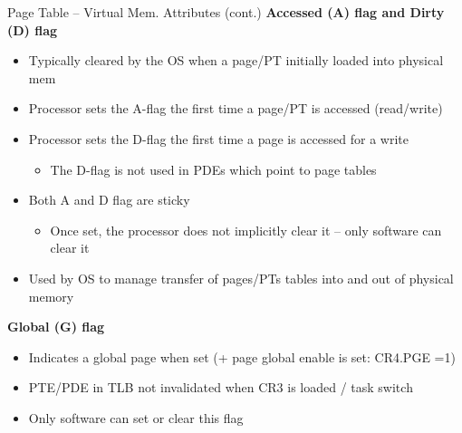 \documentclass[aspectratio=169,12pt]{beamer}
\begin{document}
\begin{frame}{Page Table – Virtual Mem. Attributes (cont.)}
\textbf{Accessed (A) flag and Dirty (D) flag}
\begin{itemize}
\item Typically cleared by the OS when a page/PT initially loaded into physical mem
\item Processor sets the A-flag the first time a page/PT is accessed (read/write)
\item Processor sets the D-flag the first time a page is accessed for a write
    \begin{itemize}
    \item The D-flag is not used in PDEs which point to page tables
    \end{itemize}
\item Both A and D flag are sticky
    \begin{itemize}
    \item Once set, the processor does not implicitly clear it – only software can clear it
    \end{itemize}
\item Used by OS to manage transfer of pages/PTs tables into and out of physical memory
\end{itemize}

\textbf{Global (G) flag}
\begin{itemize}
\item Indicates a global page when set (+ page global enable is set: CR4.PGE =1)
\item PTE/PDE in TLB not invalidated when CR3 is loaded / task switch
\item Only software can set or clear this flag
\end{itemize}
\end{frame}
\end{document}
